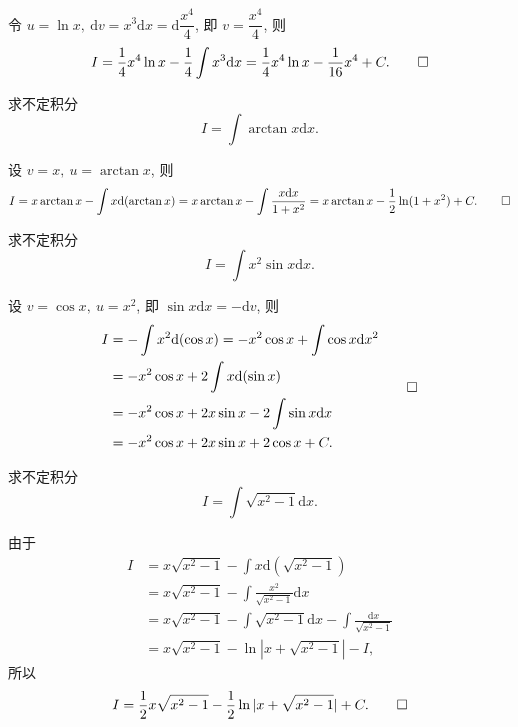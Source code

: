 \begin{solve}
令 $u=\ln x,\ \mathrm dv=x^3\mathrm dx=\mathrm d\dfrac{x^4}4$, 即 $v=\dfrac{x^4}4$, 则
\[
  I=\frac14x^4\ln x-\frac14\int x^3\mathrm dx
  =
  \frac14x^4\ln x-\frac1{16}x^4+C.
\qedhere
\]
\end{solve}


\begin{example}\label{example:ma-6-2-19}
求不定积分
\[
  I=\int\arctan x\mathrm dx.
\]
\end{example}


\begin{solve}
设 $v=x,\ u=\arctan x$, 则
\[
  I
  =
  x\arctan x-\int x\mathrm d(\arctan x)
  =
  x\arctan x-\int\frac{x\mathrm dx}{1+x^2}
  =
  x\arctan x-\frac12\ln(1+x^2)+C.
\qedhere
\]
\end{solve}


\begin{example}\label{example:ma-6-2-20}
求不定积分
\[
  I=\int x^2\sin x\mathrm dx.
\]
\end{example}


\begin{solve}
设 $v=\cos x,\ u=x^2$, 即 $\sin x\mathrm dx=-\mathrm dv$, 则
\[
\begin{aligned}
  I
  &=
  -\int x^2\mathrm d(\cos x)
  =
  -x^2\cos x+\int\cos x\mathrm d x^2\\
  &=
  -x^2\cos x+2\int x\mathrm d(\sin x)\\
  &=
  -x^2\cos x+2x\sin x-2\int\sin x\mathrm dx\\
  &=
  -x^2\cos x+2x\sin x+2\cos x+C.
\end{aligned}
\qedhere
\]
\end{solve}


\begin{example}\label{example:ma-6-2-21}
求不定积分
\[
  I=\int\sqrt{x^2-1}\mathrm dx.
\]
\end{example}


\begin{solve}[{解法 1}]
由于
\[
\begin{aligned}
  I
  &=
  x\sqrt{x^2-1}-\int x\mathrm d(\sqrt{x^2-1})\\
  &=
  x\sqrt{x^2-1}-\int\frac{x^2}{\sqrt{x^2-1}}\mathrm dx\\
  &=
  x\sqrt{x^2-1}-\int\sqrt{x^2-1}\mathrm dx-\int\frac{\mathrm dx}{\sqrt{x^2-1}}\\
  &=
  x\sqrt{x^2-1}-\ln|x+\sqrt{x^2-1}|-I,
\end{aligned}
\]
所以
\[
  I=\frac12x\sqrt{x^2-1}-\frac12\ln|x+\sqrt{x^2-1}|+C.
\qedhere
\]
\end{solve}


